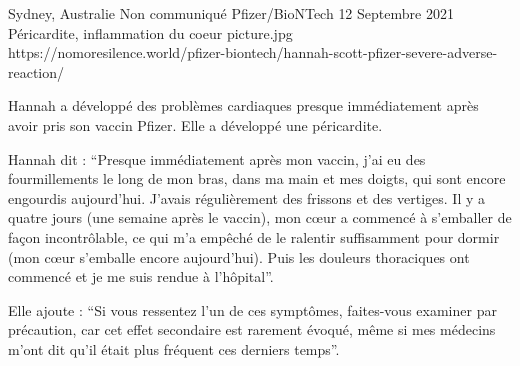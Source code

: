 {Sydney, Australie}
{Non communiqué}
{Pfizer/BioNTech}
{12 Septembre 2021}
{Péricardite, inflammation du coeur}
{picture.jpg}
{https://nomoresilence.world/pfizer-biontech/hannah-scott-pfizer-severe-adverse-reaction/}
{

Hannah a développé des problèmes cardiaques presque immédiatement après avoir
pris son vaccin Pfizer. Elle a développé une péricardite.

Hannah dit : “Presque immédiatement après mon vaccin, j'ai eu des fourmillements
le long de mon bras, dans ma main et mes doigts, qui sont encore engourdis
aujourd'hui. J'avais régulièrement des frissons et des vertiges. Il y a quatre
jours (une semaine après le vaccin), mon cœur a commencé à s'emballer de façon
incontrôlable, ce qui m'a empêché de le ralentir suffisamment pour dormir (mon
cœur s'emballe encore aujourd'hui). Puis les douleurs thoraciques ont commencé
et je me suis rendue à l'hôpital”.

Elle ajoute : “Si vous ressentez l'un de ces symptômes, faites-vous examiner par
précaution, car cet effet secondaire est rarement évoqué, même si mes médecins
m'ont dit qu'il était plus fréquent ces derniers temps”.

}
